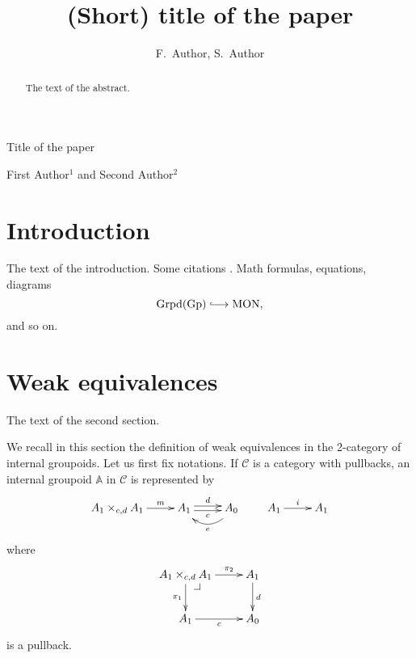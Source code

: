 \documentclass{book}
\makeatletter
\newcommand{\A}{\mathbb{A}}
\newcommand{\C}{\mathcal{C}}
\newcommand{\cd}{\xymatrix}
\newcommand{\pb}[1][dr]{\save*!/#1-1.5pc/#1:(-1,1)@^{|-}\restore}
\newcommand{\longhookrightarrow}{\ensuremath{\lhook\joinrel\relbar\joinrel\rightarrow}}
\makeatother
\begin{document}
\title{(Short) title of the paper} {Title of the paper}

\author{F.~Author, S.~Author} {First Author${}^1$ and Second Author${}^2$}

\address{${}^1$Address of the first author\\
${}^2$Address of the second author}


 \revised{} 
 

\setcounter{page}{1}


\maketitle

\begin{abstract}
The text of the abstract.
\end{abstract}




\section{Introduction}

The text of the introduction. Some citations \cite{baez-crans, benabou, borceux1, bunge-pare, gabriel-zisman}. Math formulas, equations, diagrams
\begin{equation}
\text{Grpd}(\text{Gp}) \longhookrightarrow \text{MON},
\end{equation}
and so on.

\section{Weak equivalences} \label{section weak equivalences}

The text of the second section.

We recall in this section the definition of weak equivalences in the 2-category of internal groupoids.
Let us first fix notations. If $\C$ is a category with pullbacks, an internal groupoid $\A$ in $\C$ is represented by
\begin{equation}
\cd{A_1 \times_{c,d} A_1 \ar[r]^-{m} & A_1 \ar@<2pt>[r]^-{d} \ar@<-2pt>[r]_-{c} & A_0 \ar@<2pt>@/^1pc/[l]^-{e}} \qquad \cd{A_1 \ar[r]^-{i} & A_1}
\end{equation}
where
\begin{equation}
\cd{A_1 \times_{c,d} A_1 \pb \ar[r]^-{\pi_2} \ar[d]_-{\pi_1} & A_1 \ar[d]^-{d} \\ A_1 \ar[r]_-{c} & A_0}
\end{equation}
is a pullback.
\end{document}
